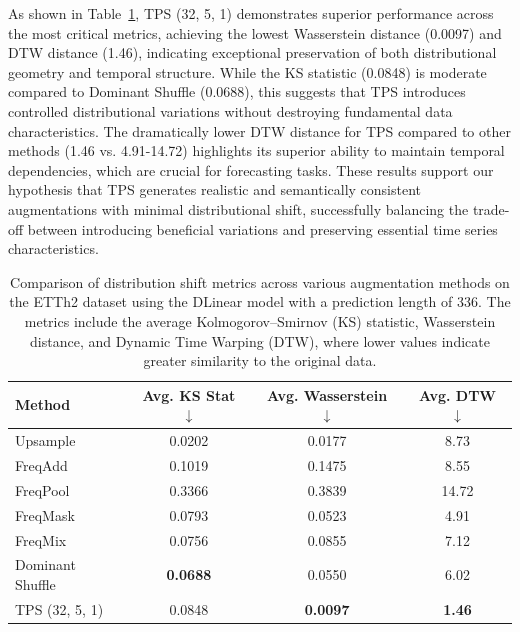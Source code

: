 As shown in Table~\ref{tab:dist_metrics}, TPS (32, 5, 1) demonstrates superior performance across the most critical metrics, achieving the lowest Wasserstein distance (0.0097) and DTW distance (1.46), indicating exceptional preservation of both distributional geometry and temporal structure. While the KS statistic (0.0848) is moderate compared to Dominant Shuffle (0.0688), this suggests that TPS introduces controlled distributional variations without destroying fundamental data characteristics. The dramatically lower DTW distance for TPS compared to other methods (1.46 vs. 4.91-14.72) highlights its superior ability to maintain temporal dependencies, which are crucial for forecasting tasks. These results support our hypothesis that TPS generates realistic and semantically consistent augmentations with minimal distributional shift, successfully balancing the trade-off between introducing beneficial variations and preserving essential time series characteristics.

\begin{table}[h!]
\centering
\renewcommand{\arraystretch}{1.0}
\begin{adjustbox}{max width=\textwidth}
\begin{tabular}{lccc}
\toprule
\textbf{Method} & \textbf{Avg. KS Stat} $\downarrow$ & \textbf{Avg. Wasserstein} $\downarrow$ & \textbf{Avg. DTW} $\downarrow$ \\
\midrule
Upsample            & 0.0202 & 0.0177 & 8.73 \\
FreqAdd             & 0.1019 & 0.1475 & 8.55 \\
FreqPool            & 0.3366 & 0.3839 & 14.72 \\
FreqMask            & 0.0793 & 0.0523 & 4.91 \\
FreqMix             & 0.0756 & 0.0855 & 7.12 \\
Dominant Shuffle    & \textbf{0.0688} & 0.0550 & 6.02 \\
TPS (32, 5, 1)      & 0.0848 & \textbf{0.0097} & \textbf{1.46} \\
\bottomrule
\end{tabular}
\end{adjustbox}
\caption{Comparison of distribution shift metrics across various augmentation methods on the ETTh2 dataset using the DLinear model with a prediction length of 336. The metrics include the average Kolmogorov–Smirnov (KS) statistic, Wasserstein distance, and Dynamic Time Warping (DTW), where lower values indicate greater similarity to the original data.}
\label{tab:dist_metrics}
\end{table}


